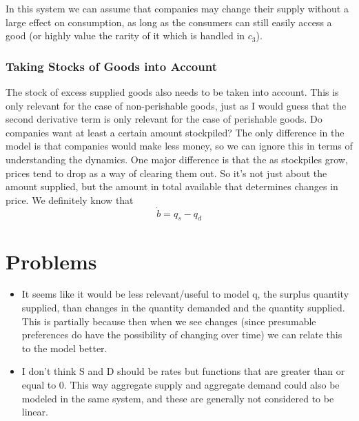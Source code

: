 \documentclass{article}
\begin{document}
In this system we can assume that companies may change their supply without a large effect on consumption, as long as the consumers can still easily access a good (or highly value the rarity of it which is handled in $c_3$).

\subsubsection{Taking Stocks of Goods into Account}
The stock of excess supplied goods also needs to be taken into account. This is only relevant for the case of non-perishable goods, just as I would guess that the second derivative term is only relevant for the case of perishable goods. Do companies want at least a certain amount stockpiled? The only difference in the model is that companies would make less money, so we can ignore this in terms of understanding the dynamics. One major difference is that the as stockpiles grow, prices tend to drop as a way of clearing them out. So it's not just about the amount supplied, but the amount in total available that determines changes in price. We definitely know that 
\begin{equation*}
	\dot{b} = q_s - q_d
\end{equation*}



\section{Problems}
\begin{itemize}
	\item It seems like it would be less relevant/useful to model q, the surplus quantity supplied, than changes in the quantity demanded and the quantity supplied. This is partially because then when we see changes (since presumable preferences do have the possibility of changing over time) we can relate this to the model better.
	\item I don't think S and D should be rates but functions that are greater than or equal to 0. This way aggregate supply and aggregate demand could also be modeled in the same system, and these are generally not considered to be linear.
\end{itemize}
\end{document}
